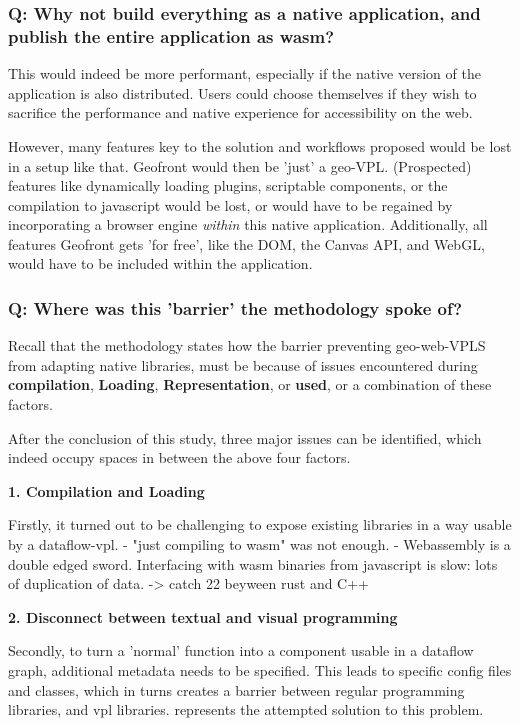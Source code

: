 \subsubsection*{Q: Why not build everything as a native application, and publish the entire application as wasm?}

This would indeed be more performant, especially if the native version of the application is also distributed. 
Users could choose themselves if they wish to sacrifice the performance and native experience for accessibility on the web. 

However, many features key to the solution and workflows proposed would be lost in a setup like that. 
Geofront would then be 'just' a geo-VPL. 
(Prospected) features like dynamically loading plugins, scriptable components, or the compilation to javascript would be lost, or would have to be regained by incorporating a browser engine \emph{within} this native application. 
Additionally, all features Geofront gets 'for free', like the DOM, the Canvas API, and WebGL, would have to be included within the application. 

\subsubsection*{Q: Where was this 'barrier' the methodology spoke of?}

Recall that the methodology states how the barrier preventing geo-web-VPLS from adapting native libraries, 
must be because of issues encountered during \textbf{compilation}, \textbf{Loading}, \textbf{Representation}, or \textbf{used}, or a combination of these factors. 

After the conclusion of this study, three major issues can be identified, which indeed occupy spaces in between the above four factors. 

\textbf{1. Compilation and Loading}

Firstly, it turned out to be challenging to expose existing libraries in a way usable by a dataflow-vpl. 
- "just compiling to wasm" was not enough.
- Webassembly is a double edged sword. Interfacing with wasm binaries from javascript is slow: lots of duplication of data. 
-> catch 22 beyween rust and C++


\textbf{2. Disconnect between textual and visual programming}

Secondly, to turn a 'normal' function into a component usable in a dataflow graph, additional metadata needs to be specified.
This leads to specific config files and classes, which in turns creates a barrier between regular programming libraries, and vpl libraries. 
 represents the attempted solution to this problem. 


